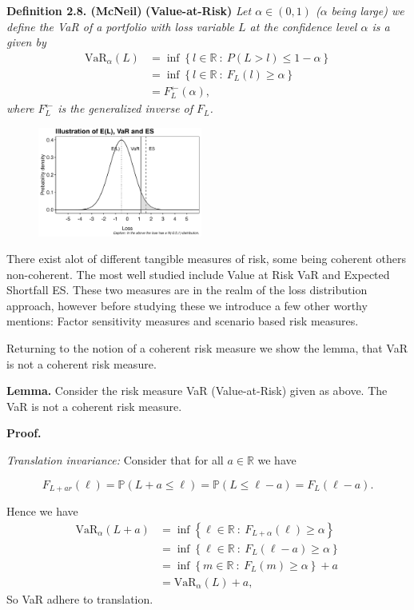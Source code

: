 \documentclass[
]{book}
\begin{document}
\textbf{Definition 2.8. (McNeil)} \textbf{(Value-at-Risk)} \emph{Let \(\alpha\in (0,1)\) (\(\alpha\) being large) we define the VaR of a portfolio with loss variable \(L\) at the confidence level \(\alpha\) is a given by}
\begin{align*}
\text{VaR}_\alpha(L)&=\inf\left\{ l\in\mathbb{R}\ :\ P(L>l)\le 1-\alpha \right\}\\
&=\inf\left\{ l\in\mathbb{R}\ :\ F_L(l)\ge \alpha \right\}\\
&=F^{\leftarrow}_L(\alpha),
\end{align*}
\emph{where \(F^{\leftarrow}_L\) is the generalized inverse of \(F_L\).}

\begin{figure}
  \begin{center}
    \includegraphics[width=0.48\textwidth]{figures/VaR_ES.png}
  \end{center}
\end{figure}

There exist alot of different tangible measures of risk, some being coherent others non-coherent. The most well studied include Value at Risk VaR and Expected Shortfall ES. These two measures are in the realm of the loss distribution approach, however before studying these we introduce a few other worthy mentions: Factor sensitivity measures and scenario based risk measures.

Returning to the notion of a coherent risk measure we show the lemma, that VaR is not a coherent risk measure.

\textbf{Lemma.} Consider the risk measure VaR (Value-at-Risk) given as above. The VaR is not a coherent risk measure.

\textbf{Proof.}

\emph{Translation invariance:} Consider that for all \(a\in\mathbb R\) we have

\[
F_{L+ar}(\ell)=\mathbb P(L+a\le \ell)=\mathbb P(L\le\ell - a)=F_L(\ell-a).
\]

Hence we have
\begin{align*}
\text{VaR}_\alpha(L+a)&=\inf\left\{ \ell\in\mathbb{R}\ :\ F_{L+\alpha}(\ell)\ge \alpha \right\}\\
&=\inf\left\{ \ell\in\mathbb{R}\ :\ F_{L}(\ell-a)\ge \alpha \right\}\\
&=\inf\left\{ m\in\mathbb{R}\ :\ F_{L}(m)\ge \alpha \right\}+a\\
&=\text{VaR}_\alpha(L)+a,
\end{align*}
So VaR adhere to translation.
\end{document}
